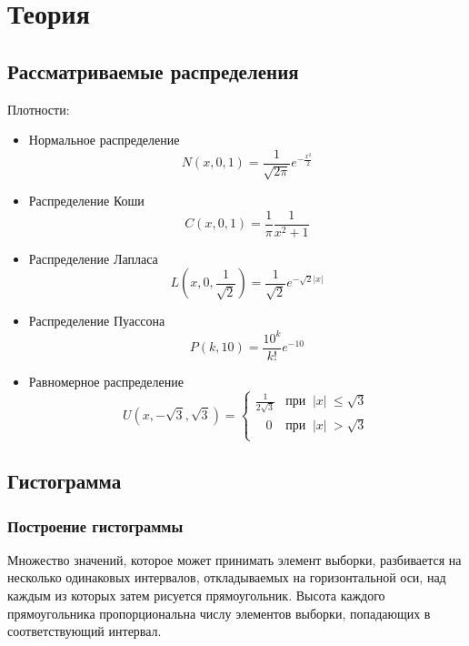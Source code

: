 \documentclass[a4paper]{article}
\begin{document}
\section{Теория}
\subsection{Рассматриваемые распределения}
Плотности:
\begin{itemize}
    \item Нормальное распределение
    \begin{equation}\label{norm}
        N(x,0,1)=\frac{1}{\sqrt{2\pi}}e^{-\frac{x^2}{2}}
    \end{equation}
    \item Распределение Коши
    \begin{equation}\label{cauchy}
        C(x, 0, 1)=\frac{1}{\pi}\frac{1}{x^2+1}
    \end{equation}
    \item Распределение Лапласа
    \begin{equation}\label{laplace}
        L(x,0,\frac{1}{\sqrt{2}})=\frac{1}{\sqrt{2}}e^{-\sqrt{2}|x|}
    \end{equation}
    \item Распределение Пуассона
    \begin{equation}\label{poisson}
        P(k, 10)=\frac{10^k}{k!}e^{-10}
    \end{equation}
    \item Равномерное распределение
    \begin{equation}\label{uniform}
        U(x,-\sqrt{3},\sqrt{3})=
        \begin{cases}
        \displaystyle\frac{1}{2\sqrt{3}}&\text{при}\;\;|x|\:\leq\sqrt{3}\\
        \;\;\;0&\text{при}\;\;|x|\:>\sqrt{3}\\
        \end{cases}
    \end{equation}
\end{itemize}
\subsection{Гистограмма}
\subsubsection{Построение гистограммы}
Множество значений, которое может принимать элемент выборки, разбивается на несколько одинаковых интервалов, откладываемых на горизонтальной оси, над каждым из которых затем рисуется прямоугольник. Высота каждого прямоугольника пропорциональна числу элементов выборки, попадающих в соответствующий интервал. 
\end{document}
